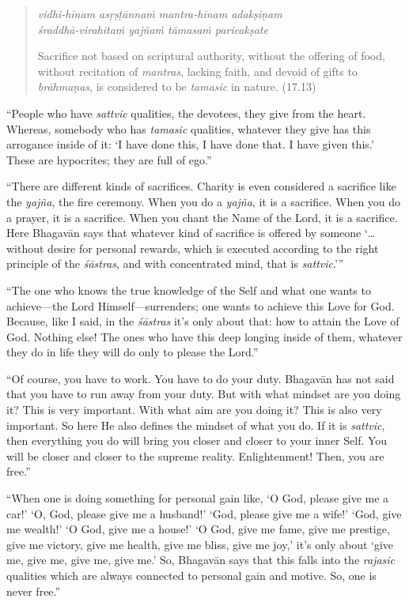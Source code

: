 \documentclass[12pt, twoside, openright]{memoir}
\begin{document}
\par
\begin{verse}
\textit{vidhi-hīnam asṛṣṭānnaṁ mantra-hīnam adakṣiṇam} \\
\textit{śraddhā-virahitaṁ yajñaṁ tāmasaṁ paricakṣate}

\noindent Sacrifice not based on scriptural authority, without the offering of food, without recitation of \textit{mantras}, lacking faith, and devoid of gifts to \textit{brāhmaṇas}, is considered to be \textit{tamasic} in nature. (17.13)
\end{verse}
\par


\enquote{People who have \textit{sattvic} qualities, the devotees, they give from the heart. Whereas, somebody who has \textit{tamasic} qualities, whatever they give has this arrogance inside of it: \enquote{I have done this, I have done that. I have given this.} These are hypocrites; they are full of ego.}

\enquote{There are different kinds of sacrifices. Charity is even considered a sacrifice like the \textit{yajña}, the fire ceremony. When you do a \textit{yajña}, it is a sacrifice. When you do a prayer, it is a sacrifice. When you chant the Name of the Lord, it is a sacrifice. Here Bhagavān says that whatever kind of sacrifice is offered by someone \enquote{\ldots without desire for personal rewards, which is executed according to the right principle of the \textit{śāstras}, and with concentrated mind, that is \textit{sattvic}.}}

\enquote{The one who knows the true knowledge of the Self and what one wants to achieve---the Lord Himself---surrenders; one wants to achieve this Love for God. Because, like I said, in the \textit{śāstras} it’s only about that: how to attain the Love of God. Nothing else! The ones who have this deep longing inside of them, whatever they do in life they will do only to please the Lord.}

\enquote{Of course, you have to work. You have to do your duty. Bhagavān has not said that you have to run away from your duty. But with what mindset are you doing it? This is very important. With what aim are you doing it? This is also very important. So here He also defines the mindset of what you do. If it is \textit{sattvic}, then everything you do will bring you closer and closer to your inner Self. You will be closer and closer to the supreme reality. Enlightenment! Then, you are free.}

\enquote{When one is doing something for personal gain like, \enquote{O God, please give me a car!} \enquote{O, God, please give me a husband!} \enquote{God, please give me a wife!} \enquote{God, give me wealth!} \enquote{O God, give me a house!} \enquote{O God, give me fame, give me prestige, give me victory, give me health, give me bliss, give me joy,} it’s only about \enquote{give me, give me, give me, give me.} So, Bhagavān says that this falls into the \textit{rajasic} qualities which are always connected to personal gain and motive. So, one is never free.}
\end{document}
